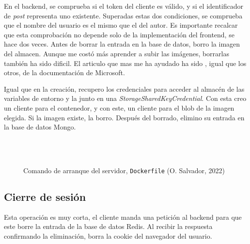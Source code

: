 \documentclass[11pt]{article}
\begin{document}
\begin{flushleft}
	En el backend, se comprueba si el token del cliente es válido, y si el identificador de \textit{post} representa uno existente. Superadas estas dos condiciones, se comprueba que el nombre del usuario es el mismo que el del autor. Es importante recalcar que esta comprobación no depende solo de la implementación del frontend, se hace dos veces. Antes de borrar la entrada en la base de datos, borro la imagen del almacen. Aunque me costó más aprender a subir las imágenes, borrarlas también ha sido dificil. El articulo que mas me ha ayudado ha sido \cite{ms_rm_blob}, igual que los otros, de la documentación de Microsoft.
	\linebreak
	
	Igual que en la creación, recupero los credenciales para acceder al almacén de las variables de entorno y la junto en una \textit{StorageSharedKeyCredential}. Con esta creo un cliente para el contenedor, y con este, un cliente para el blob de la imagen elegida. Si la imagen existe, la borro. Después del borrado, elimino su entrada en la base de datos Mongo.
	\linebreak
	
	\begin{figure}[htb]
			\centering
			\begin{subfigure}{0.9\textwidth}
			\inputminted[fontsize=\scriptsize, firstline=104, lastline=104, linenos, frame=single, breaklines]{javascript}{../../backend/src/resolvers/mutation.js}
			\vspace{-.6cm}
			\inputminted[fontsize=\scriptsize, firstline=107, lastline=110, linenos, frame=single, breaklines]{javascript}{../../backend/src/resolvers/mutation.js}
			\vspace{-.6cm}
			\inputminted[fontsize=\scriptsize, firstline=118, lastline=118, linenos, frame=single, breaklines]{javascript}{../../backend/src/resolvers/mutation.js}
			\vspace{-.6cm}
			\inputminted[fontsize=\scriptsize, firstline=126, lastline=126, linenos, frame=single, breaklines]{javascript}{../../backend/src/resolvers/mutation.js}
			\end{subfigure}
			\caption{Comando de arranque del servidor, \texttt{Dockerfile} (O. Salvador, 2022)}
		\end{figure}

	\bigskip
	\bigskip
	
	\subsection{Cierre de sesión}
	Esta operación es muy corta, el cliente manda una petición al backend para que este borre la entrada de la base de datos Redis. Al recibir la respuesta confirmando la eliminación, borra la cookie del navegador del usuario.
	\linebreak














\end{flushleft}
\end{document}
